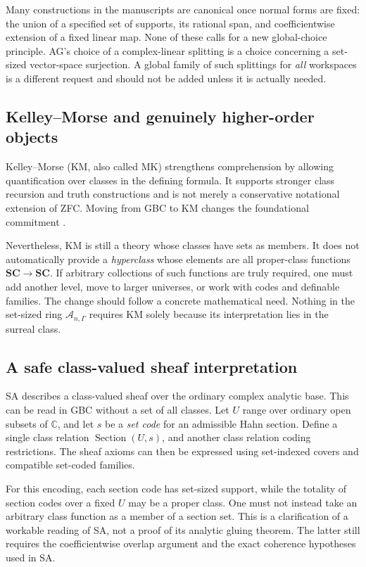 \documentclass[11pt,letterpaper]{article}
\theoremstyle{definition}
\theoremstyle{remark}
\newcommand{\SC}{\mathbf{SC}}
\newcommand{\C}{\mathbb C}
\newcommand{\A}{\mathscr A}
\numberwithin{equation}{section}
\begin{document}
Many constructions in the manuscripts are canonical once normal forms are fixed: the union of a specified set of supports, its rational span, and coefficientwise extension of a fixed linear map. None of these calls for a new global-choice principle. AG's choice of a complex-linear splitting is a choice concerning a set-sized vector-space surjection. A global family of such splittings for \emph{all} workspaces is a different request and should not be added unless it is actually needed.

\subsection{Kelley--Morse and genuinely higher-order objects}
Kelley--Morse (KM, also called MK) strengthens comprehension by allowing quantification over classes in the defining formula. It supports stronger class recursion and truth constructions and is not merely a conservative notational extension of ZFC. Moving from GBC to KM changes the foundational commitment \cite{Williams,HamkinsETR}.

Nevertheless, KM is still a theory whose classes have sets as members. It does not automatically provide a \emph{hyperclass} whose elements are all proper-class functions \(\SC\to\SC\). If arbitrary collections of such functions are truly required, one must add another level, move to larger universes, or work with codes and definable families. The change should follow a concrete mathematical need. Nothing in the set-sized ring \(\A_{n,\Gamma}\) requires KM solely because its interpretation lies in the surreal class.

\subsection{A safe class-valued sheaf interpretation}
SA describes a class-valued sheaf over the ordinary complex analytic base. This can be read in GBC without a set of all classes. Let \(U\) range over ordinary open subsets of \(\C\), and let \(s\) be a \emph{set code} for an admissible Hahn section. Define a single class relation \(\operatorname{Section}(U,s)\), and another class relation coding restrictions. The sheaf axioms can then be expressed using set-indexed covers and compatible set-coded families.

For this encoding, each section code has set-sized support, while the totality of section codes over a fixed \(U\) may be a proper class. One must not instead take an arbitrary class function as a member of a section set. This is a clarification of a workable reading of SA, not a proof of its analytic gluing theorem. The latter still requires the coefficientwise overlap argument and the exact coherence hypotheses used in SA.
\end{document}
